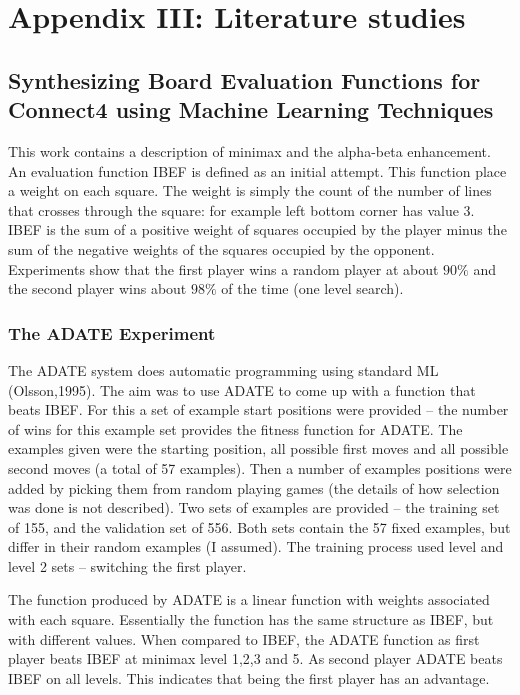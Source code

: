 \chapter*{Appendix III: Literature studies}

\section{Synthesizing Board Evaluation Functions for Connect4 using Machine Learning Techniques} 
\cite{stenmark:masters}
This work contains a description of minimax and the alpha-beta enhancement.  An evaluation function IBEF is defined as an initial attempt.  This function place a weight on each square.  The weight is simply the count of the number of lines that crosses through the square: for example left bottom corner has value 3.  IBEF is the sum of a positive weight of squares occupied by the player minus the sum of the negative weights of the squares occupied by the opponent. Experiments show that the first player wins a random player at about $90\%$ and the second player wins about $98\%$ of the time (one level search). 
\subsection{The ADATE Experiment}
\label{sec:ADATE}
The ADATE system does automatic programming using standard ML (Olsson,1995).  The aim was to use ADATE to come up with a function that beats IBEF.  For this a set of example start positions were provided -- the number of wins for this example set provides the fitness function for ADATE. The examples given were the starting position, all possible first moves and all possible second moves (a total of 57 examples).  Then a number of examples positions were added by picking them from random playing games (the details of how selection was done is not described).  Two sets of examples are provided -- the training set of 155, and the validation set of 556.  Both sets contain the 57 fixed examples, but differ in their random examples (I assumed).  The training process used level and level 2 sets -- switching the first player.

The function produced by ADATE is a linear function with weights associated with each square.  Essentially the function has the same structure as IBEF, but with different values. When compared to IBEF, the ADATE function as first player beats IBEF at minimax level 1,2,3 and 5.  As second player ADATE beats IBEF on all levels.  This indicates that being the first player has an advantage.

